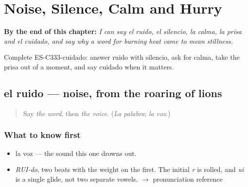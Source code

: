
\chapter{Noise, Silence, Calm and Hurry}
\label{ch:calma-y-prisa}

\begin{chapteropening}
\textbf{By the end of this chapter:} \emph{I can say el ruido, el silencio, la calma, la prisa and el cuidado, and say why a word for burning heat came to mean stillness.}

Complete ES-C333-cuidado: answer ruido with silencio, ask for calma, take the prisa out of a moment, and say cuidado when it matters.
\end{chapteropening}

\section[el ruido]{el ruido — noise, from the roaring of lions}

\label{lesson:ES-C333-ruido}



\begin{quote}
Say \emph{the word}, then \emph{the voice}. (\emph{La palabra}; \emph{la voz}.)
\end{quote}

\subsection*{What to know first}
\begin{itemize}
\raggedright
  \item la voz — the sound this one drowns out.
\end{itemize}

\begin{sounds}
\begin{itemize}
\raggedright
  \item \emph{RUI-do}, two beats with the weight on the first. The initial \emph{r} is rolled, and \emph{ui} is a single glide, not two separate vowels. $\to$ pronunciation reference
\end{itemize}
\end{sounds}

